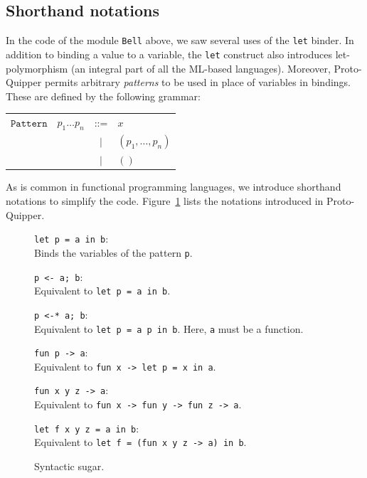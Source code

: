 \subsection{Shorthand notations}

In the code of the module \verb#Bell# above, we saw several uses of
the \verb#let# binder. In addition to binding a value to a variable,
the \verb#let# construct also introduces let-polymorphism (an integral
part of all the ML-based languages). Moreover, Proto-Quipper permits
arbitrary \emph{patterns} to be used in place of variables in
bindings. These are defined by the following grammar:
\begin{center}
\begin{tabular}{rrcl}
  $\mathtt{Pattern}$& $p_1 \dots p_n$ & ::= & $x$ \\
                     &                & $|$ & $(p_1, \dots, p_n)$ \\
		     &                & $|$ & $()$
\end{tabular}
\end{center}
As is common in functional programming languages, we introduce shorthand notations to simplify the code. Figure~\ref{sugar} lists the notations introduced in Proto-Quipper. 

\begin{figure}[!ht]
\begin{compactitemize}
\item \verb#let p = a in b#:\\ Binds the variables of the pattern 
  \verb#p#.
\item \verb#p <- a; b#:\\ Equivalent to \verb#let p = a in b#.
\item \verb#p <-* a; b#: \\ Equivalent to \verb#let p = a p in b#.
  Here, \verb#a# must be a function.
\item  \verb#fun p -> a#: \\ Equivalent to
                                \verb#fun x -> let p = x in a#.
\item  \verb#fun x y z -> a#: \\ Equivalent to
                                \verb#fun x -> fun y -> fun z -> a#.
\item  \verb#let f x y z = a in b#: \\ Equivalent to
  \verb#let f = (fun x y z -> a) in b#.
\end{compactitemize}
\caption{Syntactic sugar.}
\label{sugar}
\end{figure}

